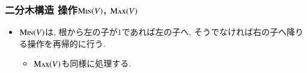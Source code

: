 \documentclass[main]{subfiles}
\begin{document}
\begin{frame}\frametitle{二分木構造 操作$\mathrm{\text{M\textsc{in}}}(V)$, $\mathrm{\text{M\textsc{ax}}}(V)$}
\begin{itemize}
\item $\mathrm{\text{M\textsc{in}}}(V)$は, 根から左の子が$1$であれば左の子へ, そうでなければ右の子へ降りる操作を再帰的に行う.
\begin{itemize}
	\item $\mathrm{\text{M\textsc{ax}}}(V)$も同様に処理する.
\end{itemize}
\end{itemize}


\end{frame}
\end{document}

